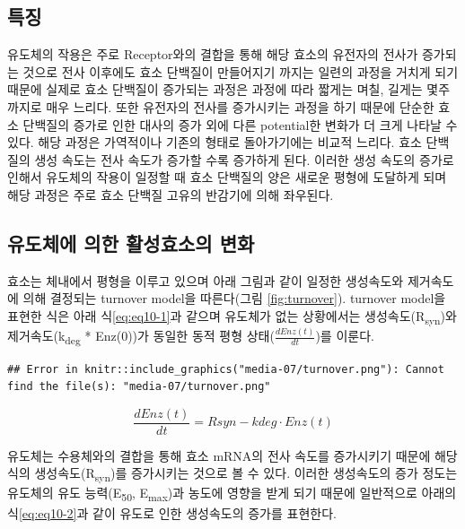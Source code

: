 \documentclass[
  11pt,
  krantz2, a4paper, twoside]{krantz}
\begin{document}
\hypertarget{uxd2b9uxc9d5}{%
\subsection{특징}\label{uxd2b9uxc9d5}}

유도체의 작용은 주로 Receptor와의 결합을 통해 해당 효소의 유전자의 전사가 증가되는 것으로 전사 이후에도 효소 단백질이 만들어지기 까지는 일련의 과정을 거치게 되기 때문에 실제로 효소 단백질이 증가되는 과정은 과정에 따라 짧게는 며칠, 길게는 몇주까지로 매우 느리다. 또한 유전자의 전사를 증가시키는 과정을 하기 때문에 단순한 효소 단백질의 증가로 인한 대사의 증가 외에 다른 potential한 변화가 더 크게 나타날 수 있다.
해당 과정은 가역적이나 기존의 형태로 돌아가기에는 비교적 느리다. 효소 단백질의 생성 속도는 전사 속도가 증가할 수록 증가하게 된다.
이러한 생성 속도의 증가로 인해서 유도체의 작용이 일정할 때 효소 단백질의 양은 새로운 평형에 도달하게 되며 해당 과정은 주로 효소 단백질 고유의 반감기에 의해 좌우된다.

\hypertarget{uxc720uxb3c4uxccb4uxc5d0-uxc758uxd55c-uxd65cuxc131uxd6a8uxc18cuxc758-uxbcc0uxd654}{%
\subsection{유도체에 의한 활성효소의 변화}\label{uxc720uxb3c4uxccb4uxc5d0-uxc758uxd55c-uxd65cuxc131uxd6a8uxc18cuxc758-uxbcc0uxd654}}

효소는 체내에서 평형을 이루고 있으며 아래 그림과 같이 일정한 생성속도와 제거속도에 의해 결정되는 turnover model을 따른다(그림 \ref{fig:turnover}). turnover model을 표현한 식은 아래 식\eqref{eq:eq10-1}과 같으며 유도체가 없는 상황에서는 생성속도(R\textsubscript{syn})와 제거속도(k\textsubscript{deg} * Enz(0))가 동일한 동적 평형 상태(\(\frac{dEnz(t)}{dt}\))를 이룬다.

\begin{verbatim}
## Error in knitr::include_graphics("media-07/turnover.png"): Cannot find the file(s): "media-07/turnover.png"
\end{verbatim}



\begin{equation}
\frac{dEnz(t)}{dt} = R{syn} - k{deg} \cdot Enz(t)
\label{eq:eq10-1} 
\end{equation}

유도체는 수용체와의 결합을 통해 효소 mRNA의 전사 속도를 증가시키기 때문에 해당 식의 생성속도(R\textsubscript{syn})를 증가시키는 것으로 볼 수 있다. 이러한 생성속도의 증가 정도는 유도체의 유도 능력(E\textsubscript{50}, E\textsubscript{max})과 농도에 영향을 받게 되기 때문에 일반적으로 아래의 식\eqref{eq:eq10-2}과 같이 유도로 인한 생성속도의 증가를 표현한다.
\end{document}
